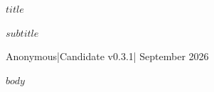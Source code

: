\documentclass[11pt,a4paper]{article}
\begin{document}
\begin{center}
{\LARGE\bfseries $title$\par}
\vspace{6pt}
{\large $subtitle$\par}
\vspace{8pt}
{\small Anonymous\quad |\quad Candidate v0.3.1\quad | September 2026\par}
\end{center}
\vspace{4pt}
$body$
\end{document}
